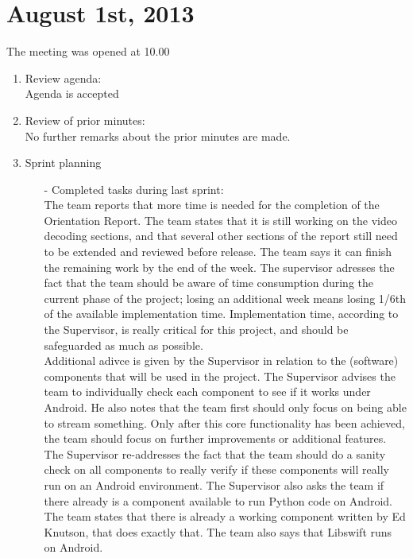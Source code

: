 \section{August 1st, 2013}

The meeting was opened at 10.00

\begin{enumerate}
\item Review agenda:\\		
Agenda is accepted

\item Review of prior minutes:\\		
No further remarks about the prior minutes are made.

\item Sprint planning\\
\begin{enumerate}
\item[-] Completed tasks during last sprint:\\
The team reports that more time is needed for the completion of the Orientation Report. The team states that it is still working on the video decoding sections, and that several other sections of the report still need to be extended and reviewed before release. The team says it can finish the remaining work by the end of the week. The supervisor adresses the fact that the team should be aware of time consumption during the current phase of the project; losing an additional week means losing 1/6th of the available implementation time. Implementation time, according to the Supervisor, is really critical for this project, and should be safeguarded as much as possible.\\

Additional adivce is given by the Supervisor in relation to the (software) components that will be used in the project. The Supervisor advises the team to individually check each component to see if it works under Android. He also notes that the team first should only focus on being able to stream something. Only after this core functionality has been achieved, the team should focus on further improvements or additional features.\\

The Supervisor re-addresses the fact that the team should do a sanity check on all components to really verify if these components will really run on an Android environment. The Supervisor also asks the team if there already is a component available to run Python code on Android. The team states that there is already a working component written by Ed Knutson, that does exactly that. The team also says that Libswift runs on Android.\\


\end{enumerate}
\end{enumerate}
